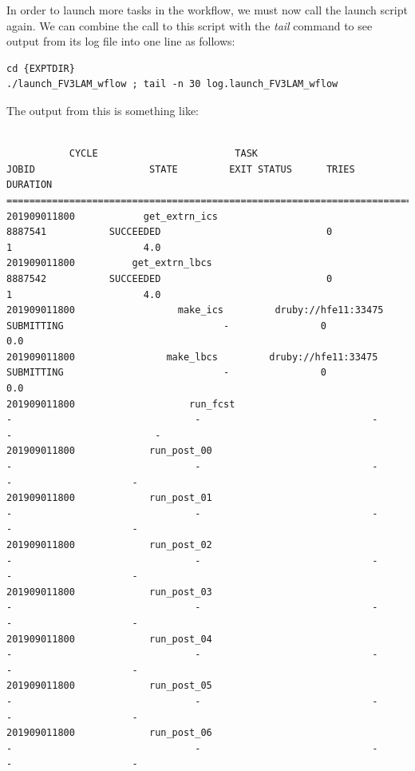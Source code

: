 \documentclass[11pt,fleqn]{report}              %
\begin{document}
In order to launch more tasks in the workflow, we must now call the launch script again. We can combine the call to this script with the {\it tail} command to see output from its log file into one line as follows:

\lstset{language=bash}   
\begin{lstlisting}[frame=trBL]
cd {EXPTDIR}
./launch_FV3LAM_wflow ; tail -n 30 log.launch_FV3LAM_wflow
\end{lstlisting}

The output from this is something like:

\lstset{language=bash}   
\begin{lstlisting}[frame=trBL, basicstyle=\tiny]

           CYCLE                        TASK                                JOBID                    STATE         EXIT STATUS      TRIES         DURATION
====================================================================================================
201909011800            get_extrn_ics                            8887541           SUCCEEDED                             0                1                       4.0
201909011800          get_extrn_lbcs                            8887542           SUCCEEDED                             0                1                       4.0
201909011800                  make_ics         druby://hfe11:33475           SUBMITTING                            -                0              	    0.0
201909011800                make_lbcs         druby://hfe11:33475           SUBMITTING                            -                0                       0.0
201909011800                    run_fcst                                       -                                -                              -                -                         -
201909011800             run_post_00                                       -                                -                              -                -           	      -
201909011800             run_post_01                                       -                                -                              -                -            	      -
201909011800             run_post_02                                       -                                -                              -                -            	      -
201909011800             run_post_03                                       -                                -                              -                -            	      -
201909011800             run_post_04                                       -                                -                              -                -            	      -
201909011800             run_post_05                                       -                                -                              -                -            	      -
201909011800             run_post_06                                       -                                -                              -                -            	      -

\end{lstlisting}
\end{document}
